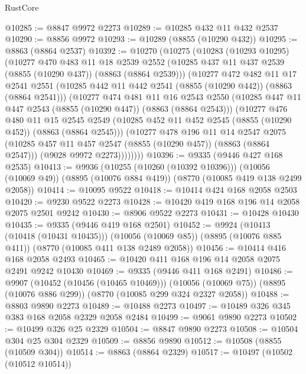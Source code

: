 \begin{lexlean}{RustCore}
\begin{coremodule}
@10285 := @8847 @9972 @2273
@10289 := @10285 @432 @11 @432 @2537
@10290 := @8856 @9972
@10293 := @10289 (@8855 (@10290 @432))
@10295 := @8863 (@8864 @2537)
@10392 := @10270
    (@10275
      (@10283
        (@10293 @10295)
        (@10277
          @470
          @483
          @11
          @18
          @2539
          @2552
          (@10285 @437 @11 @437 @2539 (@8855 (@10290 @437)) (@8863 (@8864 @2539)))
          (@10277
            @472
            @482
            @11
            @17
            @2541
            @2551
            (@10285 @442 @11 @442 @2541 (@8855 (@10290 @442)) (@8863 (@8864 @2541)))
            (@10277
              @474
              @481
              @11
              @16
              @2543
              @2550
              (@10285 @447 @11 @447 @2543 (@8855 (@10290 @447)) (@8863 (@8864 @2543)))
              (@10277
                @476
                @480
                @11
                @15
                @2545
                @2549
                (@10285 @452 @11 @452 @2545 (@8855 (@10290 @452)) (@8863 (@8864 @2545)))
                (@10277
                  @478
                  @196
                  @11
                  @14
                  @2547
                  @2075
                  (@10285 @457 @11 @457 @2547 (@8855 (@10290 @457)) (@8863 (@8864 @2547)))
                  (@9028 @9972 @2273))))))))
@10396 := @9335 (@9446 @427 @168 @2535)
@10413 := @9936
    (@10255 (@10260 (@10392 @10396)))
    (@10056 (@10069 @49))
    (@8895 (@10076 @884 @419))
    (@8770 (@10085 @419 @138 @2499 @2058))
@10414 := @10095 @9522
@10418 := @10414 @424 @168 @2058 @2503
@10420 := @9230 @9522 @2273
@10428 := @10420 @419 @168 @196 @14 @2058 @2075 @2501 @9242
@10430 := @8906 @9522 @2273
@10431 := @10428 @10430
@10435 := @9335 (@9446 @419 @168 @2501)
@10452 := @9924
    (@10413 (@10418 (@10431 @10435)))
    (@10056 (@10069 @85))
    (@8895 (@10076 @885 @411))
    (@8770 (@10085 @411 @138 @2489 @2058))
@10456 := @10414 @416 @168 @2058 @2493
@10465 := @10420 @411 @168 @196 @14 @2058 @2075 @2491 @9242 @10430
@10469 := @9335 (@9446 @411 @168 @2491)
@10486 := @9907
    (@10452 (@10456 (@10465 @10469)))
    (@10056 (@10069 @75))
    (@8895 (@10076 @886 @299))
    (@8770 (@10085 @299 @324 @2327 @2058))
@10488 := @8803 @9890 @2273
@10489 := @10488 @2273
@10497 := @10489 @326 @345 @383 @168 @2058 @2329 @2058 @2484
@10499 := @9061 @9890 @2273
@10502 := @10499 @326 @25 @2329
@10504 := @8847 @9890 @2273
@10508 := @10504 @304 @25 @304 @2329
@10509 := @8856 @9890
@10512 := @10508 (@8855 (@10509 @304))
@10514 := @8863 (@8864 @2329)
@10517 := @10497 (@10502 (@10512 @10514))

\end{coremodule}
\end{lexlean}
